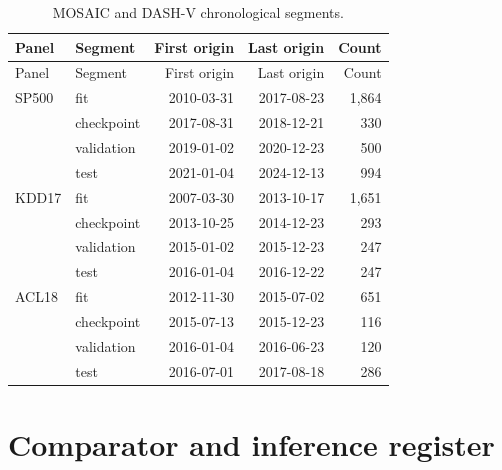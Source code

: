 \documentclass[10pt]{article}
\begin{document}
\begin{longtable}{llrrr}
\caption{MOSAIC and DASH-V chronological segments.}\\
\toprule
Panel & Segment & First origin & Last origin & Count \\
\midrule\endfirsthead
\toprule Panel & Segment & First origin & Last origin & Count \\ \midrule\endhead
SP500 & fit & 2010-03-31 & 2017-08-23 & 1,864 \\
 & checkpoint & 2017-08-31 & 2018-12-21 & 330 \\
 & validation & 2019-01-02 & 2020-12-23 & 500 \\
 & test & 2021-01-04 & 2024-12-13 & 994 \\
KDD17 & fit & 2007-03-30 & 2013-10-17 & 1,651 \\
 & checkpoint & 2013-10-25 & 2014-12-23 & 293 \\
 & validation & 2015-01-02 & 2015-12-23 & 247 \\
 & test & 2016-01-04 & 2016-12-22 & 247 \\
ACL18 & fit & 2012-11-30 & 2015-07-02 & 651 \\
 & checkpoint & 2015-07-13 & 2015-12-23 & 116 \\
 & validation & 2016-01-04 & 2016-06-23 & 120 \\
 & test & 2016-07-01 & 2017-08-18 & 286 \\
\bottomrule
\end{longtable}

\section{Comparator and inference register}
\end{document}
